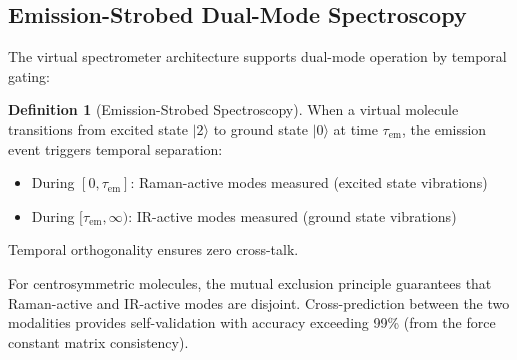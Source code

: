 \documentclass[11pt,twocolumn,a4paper]{article}
\theoremstyle{definition}
\newtheorem{definition}[theorem]{Definition}
\theoremstyle{remark}
\begin{document}
\subsection{Emission-Strobed Dual-Mode Spectroscopy}

The virtual spectrometer architecture supports dual-mode operation by temporal gating:

\begin{definition}[Emission-Strobed Spectroscopy]
When a virtual molecule transitions from excited state $|2\rangle$ to ground state $|0\rangle$ at time $\tau_{\mathrm{em}}$, the emission event triggers temporal separation:
\begin{itemize}[nosep]
\item During $[0, \tau_{\mathrm{em}}]$: Raman-active modes measured (excited state vibrations)
\item During $[\tau_{\mathrm{em}}, \infty)$: IR-active modes measured (ground state vibrations)
\end{itemize}
Temporal orthogonality ensures zero cross-talk.
\end{definition}

For centrosymmetric molecules, the mutual exclusion principle \citep{wilson1955, long2002} guarantees that Raman-active and IR-active modes are disjoint. Cross-prediction between the two modalities provides self-validation with accuracy exceeding 99\% (from the force constant matrix consistency).
\end{document}
